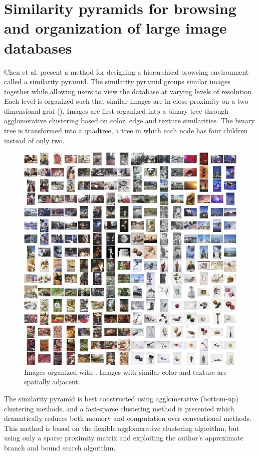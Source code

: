 \section{Similarity pyramids for browsing and organization of large image databases} %
\label{sub:Chen}

Chen et al. \cite{Chen:1998p2344} present a method for designing a hierarchical browsing environment called a similarity pyramid. The similarity pyramid groups similar images together while allowing users to view the database at varying levels of resolution. Each level is organized such that similar images are in close proximity on a two-dimensional grid (). Images are first organized into a binary tree through agglomerative clustering based on color, edge and texture similarities. The binary tree is transformed into a quadtree, a tree in which each node has four children instead of only two.

\begin{figure}[ht]
	\centering
		\includegraphics[scale=0.8]{imgs-RelatedWork/Chen-1998p2344.png}
	\caption{Images organized with \cite{Chen:1998p2344}. Images with similar color and texture are spatially adjacent.}
	\label{fig:Chen1}
\end{figure}

The similarity pyramid is best constructed using agglomerative (bottom-up) clustering methods, and a fast-sparse clustering method is presented which dramatically reduces both memory and computation over conventional methods. This method is based on the flexible agglomerative clustering algorithm, but using only a sparse proximity matrix and exploiting the author's approximate branch and bound search algorithm.

